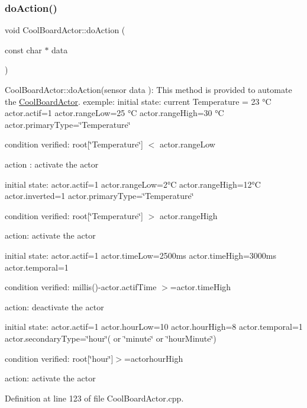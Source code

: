 \subsubsection{\texorpdfstring{do\+Action()}{doAction()}}
{\footnotesize\ttfamily void Cool\+Board\+Actor\+::do\+Action (\begin{DoxyParamCaption}\item[{const char $\ast$}]{data }\end{DoxyParamCaption})}

Cool\+Board\+Actor\+::do\+Action(sensor data )\+: This method is provided to automate the \hyperlink{class_cool_board_actor}{Cool\+Board\+Actor}. exemple\+: initial state\+: current Temperature = 23 °C actor.\+actif=1 actor.\+range\+Low=25 °C actor.\+range\+High=30 °C actor.\+primary\+Type=\char`\"{}\+Temperature\char`\"{}

condition verified\+: root\mbox{[}\char`\"{}\+Temperature\char`\"{}\mbox{]} $<$ actor.\+range\+Low

action \+: activate the actor

initial state\+: actor.\+actif=1 actor.\+range\+Low=2°C actor.\+range\+High=12°C actor.\+inverted=1 actor.\+primary\+Type=\char`\"{}\+Temperature\char`\"{}

condition verified\+: root\mbox{[}\char`\"{}\+Temperature\char`\"{}\mbox{]} $>$ actor.\+range\+High

action\+: activate the actor

initial state\+: actor.\+actif=1 actor.\+time\+Low=2500ms actor.\+time\+High=3000ms actor.\+temporal=1

condition verified\+: millis()-\/actor.\+actif\+Time $>$=actor.\+time\+High

action\+: deactivate the actor

initial state\+: actor.\+actif=1 actor.\+hour\+Low=10 actor.\+hour\+High=8 actor.\+temporal=1 actor.\+secondary\+Type=\char`\"{}hour\char`\"{}( or \char`\"{}minute\char`\"{} or \char`\"{}hour\+Minute\char`\"{})

condition verified\+: root\mbox{[}\char`\"{}hour\char`\"{}\mbox{]}$>$=actorhour\+High

action\+: activate the actor 

Definition at line 123 of file Cool\+Board\+Actor.\+cpp.


